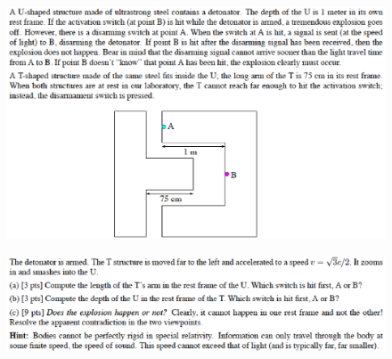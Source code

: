 \begin{figure}[h!]
\begin{center}
\includegraphics[width = 12cm]{paradox_1.eps}
\end{center}
\end{figure}

\begin{figure}[h!]
\begin{center}
\includegraphics[width = 12cm]{paradox_2.eps}
\end{center}
\end{figure}





